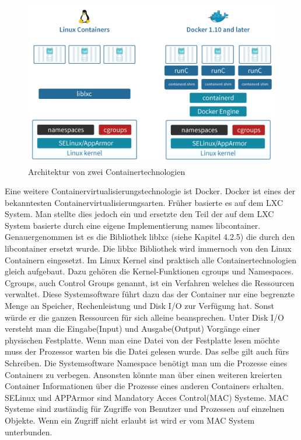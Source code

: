 \documentclass[10pt]{article}
\begin{document}
\begin{figure}[h!]
    \centering
    \includegraphics[width=12cm]{Bilder/ContainerArchitektur.png}
    \caption{Architektur von zwei Containertechnologien \cite{15}}
    \label{fig:figlabel}
\end{figure}


Eine weitere Containervirtualisierungstechnologie ist Docker. Docker ist eines der bekanntesten Containervirtualisierungsarten. Früher basierte es auf dem LXC System. Man stellte dies jedoch ein und ersetzte den Teil der auf dem LXC System basierte durch eine eigene Implementierung names libcontainer. Genauergenommen ist es die Bibliothek liblxc (siehe Kapitel 4.2.5) die durch den libcontainer ersetzt wurde. Die liblxc Bibliothek wird immernoch von den Linux Containern eingesetzt.  Im Linux Kernel sind praktisch alle Containertechnologien gleich aufgebaut. Dazu gehören die Kernel-Funktionen cgroups und Namespaces. Cgroups, auch Control Groups genannt, ist ein Verfahren welches die Ressourcen verwaltet. Diese Systemsoftware führt dazu das der Container nur eine begrenzte Menge an Speicher, Rechenleistung und Disk I/O zur Verfügung hat. Sonst würde er die ganzen Ressourcen für sich alleine beansprechen. Unter Disk I/O versteht man die Eingabe(Input) und Ausgabe(Output) Vorgänge einer physischen Festplatte. Wenn man eine Datei von der Festplatte lesen möchte muss der Prozessor warten bis die Datei gelesen wurde. Das selbe gilt auch fürs Schreiben. \cite{20} Die Systemsoftware Namespace benötigt man um die Prozesse eines Containers zu verbegen. Ansonsten könnte man über einen weiteren kreierten Container Informationen über die Prozesse eines anderen Containers erhalten.\cite{21} SELinux und APPArmor sind Mandatory Acces Control(MAC) Systeme. MAC Systeme sind zuständig für Zugriffe von Benutzer und Prozessen auf  einzelnen Objekte. Wenn ein Zugriff nicht erlaubt ist wird er vom MAC System unterbunden.\cite{22} 
\pagebreak
\end{document}
